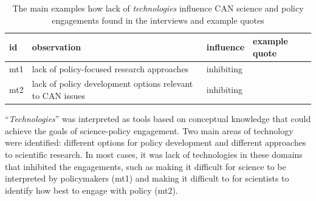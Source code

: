 \begin{table}[!ht]
\footnotesize
\caption{The main examples how lack of \emph{technologies} influence CAN science and policy engagements found in the interviews and example quotes}\label{tab:restechnologies}
\begin{tabular}{L{.06\linewidth}L{.3\linewidth}L{.12\linewidth}L{.52\linewidth}} \hline
\textbf{id} & \textbf{observation} & \textbf{influence} & \textbf{example quote} \\ \hline \hline 
mt1 & lack of policy-focused research approaches & inhibiting &  \\[5mm]
mt2 & lack of policy development options relevant to CAN issues & inhibiting &  \\[5mm]\hline
\end{tabular}
\end{table}
		
``\emph{Technologies}'' was interpreted as tools based on conceptual knowledge that could achieve the goals of science-policy engagement. Two main areas of technology were identified: different options for policy development and different approaches to scientific research. In most cases, it was lack of technologies in these domains that inhibited the engagements, such as making it difficult for science to be interpreted by policymakers (mt1) and making it difficult to for scientists to identify how best to engage with policy (mt2).

